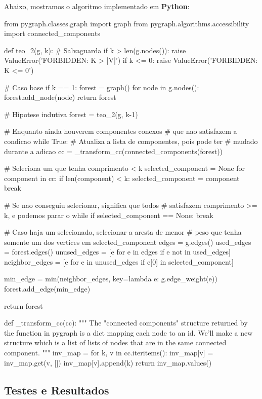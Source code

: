 \documentclass[a4paper]{article}
\begin{document}
Abaixo, mostramos o algoritmo implementado em \textbf{Python}:

\begin{python}
from pygraph.classes.graph import graph
from pygraph.algorithms.accessibility import connected_components

def teo_2(g, k):
  # Salvaguarda
  if k > len(g.nodes()):
    raise ValueError('FORBIDDEN: K > |V|')
  if k <= 0:
    raise ValueError('FORBIDDEN: K <= 0')

  # Caso base
  if k == 1:
    forest = graph()
    for node in g.nodes():
      forest.add_node(node)
    return forest

  # Hipotese indutiva
  forest = teo_2(g, k-1)

  # Enquanto ainda houverem componentes conexos
  # que nao satisfazem a condicao
  while True:
    # Atualiza a lista de componentes, pois pode ter
    # mudado durante a adicao
    cc = _transform_cc(connected_components(forest))

    # Seleciona um que tenha comprimento < k
    selected_component = None
    for component in cc:
      if len(component) < k:
        selected_component = component
        break

    # Se nao conseguiu selecionar, significa que todos
    # satisfazem comprimento >= k, e podemos parar o while
    if selected_component == None:
      break

    # Caso haja um selecionado, selecionar a aresta de menor
    # peso que tenha somente um dos vertices em selected_component
    edges = g.edges()
    used_edges = forest.edges()
    unused_edges = [e for e in edges if e not in used_edges]
    neighbor_edges = [e for e in unused_edges if e[0] in selected_component]

    min_edge = min(neighbor_edges, key=lambda e: g.edge_weight(e))
    forest.add_edge(min_edge)

  return forest


def _transform_cc(cc):
  """
  The "connected components" structure returned
  by the function in pygraph is a dict mapping each
  node to an id.
  We'll make a new structure which is a list of lists
  of nodes that are in the same connected component.
  """
  inv_map = {}
  for k, v in cc.iteritems():
    inv_map[v] = inv_map.get(v, [])
    inv_map[v].append(k)
  return inv_map.values()
\end{python}

\subsection*{Testes e Resultados}
\end{document}
